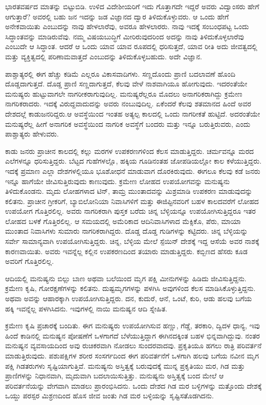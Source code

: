 ಭಾರತವರ್ಷದ ಮಾತನ್ನು ಬಿಟ್ಟುಬಿಡಿ. ಉಳಿದ ವಿದೇಶೀಯರಿಗೆ ಇದು ಗೊತ್ತಾಗದೇ ಇದ್ದರೆ ಅವರು ವಿದ್ವಾಂಸರು ಹೇಗೆ ಆಗುತ್ತಾರೆ? ಅವರಲ್ಲಿ ಬಹು ಜನ ಇದನ್ನು ಜಡ ವಿಜ್ಞಾನದ ದ್ವಾರ ತಿಳಿದುಕೊಳ್ಳುವರು. ಆ ಒಂದು ಹೇಗೆ ಅನೇಕವಾಯಿತು ಎಂಬುದನ್ನು ನಾವು ಹೇಳಲಾರೆವು, ಅವರೂ ಹೇಳಲಾರರು. ನಾವು ಇದಕ್ಕೆ ಸಂಬಂಧಪಟ್ಟ ಒಂದು ಸಿದ್ಧಾಂತವನ್ನು ಮಾಡಿರುವೆವು. ನಮ್ಮ ವಿಷಯಬುದ್ಧಿಗೆ ಮೀರಿರುವುದರಿಂದ ಅದನ್ನು ನಾವು ತಿಳಿದುಕೊಳ್ಳಲಾರೆವು ಎಂಬುದೇ ಆ ಸಿದ್ಧಾಂತ. ಆದರೆ ಆ ಒಂದು ಯಾವ ಯಾವ ರೂಪದಲ್ಲಿ ಧರಿಸುತ್ತದೆ, ಯಾವ ರೀತಿ ಅದು ಜೀವತ್ವದಲ್ಲಿ ಮತ್ತು ವ್ಯಕ್ತಿತ್ವದಲ್ಲಿ ಪರಿಣಾಮವಾತ್ತದೆ ಎಂಬುದನ್ನು ತಿಳಿದುಕೊಳ್ಳಬಹುದು. ಅದೇ ವಿಜ್ಞಾನ.

ಪಾಶ್ಚಾತ್ಯರಲ್ಲಿ ಈಗ ಹೆಚ್ಚು ಕಡಿಮೆ ಎಲ್ಲರೂ ವಿಕಾಸವಾದಿಗಳು. ಸಣ್ಣದೊಂದು ಪ್ರಾಣಿ ಬದಲಾವಣೆ ಹೊಂದಿ ದೊಡ್ಡದಾಗುತ್ತದೆ. ದೊಡ್ಡ ಪ್ರಾಣಿ ಸಣ್ಣದಾಗುತ್ತದೆ, ಕೆಲವು ವೇಳೆ ನಾಶವಾಗಿಯೂ ಹೋಗುವುದು. ಇದರಂತೆಯೇ ಮನುಷ್ಯರು ಹುಟ್ಟುವಾಗಲೇ ನಾಗರೀಕರಾಗುವುದಿಲ್ಲ. ಮನುಷ್ಯರೆಲ್ಲರೂ ಮೊದಲು ಅನಾಗರಿಕರಾಗಿದ್ದು ಕ್ರಮೇಣ ನಾಗರಿಕರಾದರು. ಇದಕ್ಕೆ ವಿರುದ್ದವಾದುದನ್ನು ಅವರು ನಂಬುವುದಿಲ್ಲ. ಏಕೆಂದರೆ ಕೆಲವು ಶತಮಾನದ ಹಿಂದೆ ಅವರ ದೇಶದಲ್ಲೆ ಕಾಡುಜನರಿದ್ದರು.ಆ ಅವಸ್ಥೆಯಿಂದ ಇಂತಹ ಅತ್ಯಲ್ಪ ಕಾಲದಲ್ಲಿ ಒಂದು ನಾಗರೀಕತೆ ಹುಟ್ಟಿದೆ. ಅದರಂತೆಯೇ ಮನುಷ್ಯರೆಲ್ಲ ಹೀಗೆ ಅನಾಗರಿಕ ಅವಸ್ಥೆಯಿಂದ ನಾಗರಿಕ ಅವಸ್ಥೆಗೆ ಬಂದರು ಮತ್ತು ಇನ್ನೂ ಬರುತ್ತಿರುವರು, ಎಂದು ಪಾಶ್ಚಾತ್ಯರು ಹೇಳುವರು.

ಕಾಡು ಜನರು ಪ್ರಾಚೀನ ಕಾಲದಲ್ಲಿ ಕಲ್ಲು ಮರಗಳ ಉಪಕರಣಗಳಿಂದ ಕೆಲಸ ಮಾಡುತ್ತಿದ್ದರು. ಚರ್ಮವನ್ನೂ ಮರದ ಎಲೆಗಳನ್ನೂ ಧರಿಸುತ್ತಿದ್ದರು. ಬೆಟ್ಟದ ಗುಹೆಗಳಲ್ಲೊ, ಹಕ್ಕಿಯ ಗೂಡಿನಂತಹ ಜೋಪಡಿಯಲ್ಲೋ ಕಾಲ ಕಳೆಯುತ್ತಿದ್ದರು. ಇದಕ್ಕೆ ಪ್ರಮಾಣ ಎಲ್ಲಾ ದೇಶಗಳಲ್ಲಿಯೂ ಭೂಶೋಧನೆ ಮಾಡುವಾಗ ದೊರಕಿರುವುದು. ಈಗಲೂ ಕೆಲವು ಕಡೆ ಜನರು ಇನ್ನೂ ಹಾಗೆಯೇ ಜೀವಿಸುತ್ತಿರುವುದು ಕಾಣುವುದು. ಕ್ರಮೇಣ ಲೋಹದ ಉಪಯೋಗವನ್ನು ಮನುಷ್ಯನು ತಿಳಿದುಕೊಂಡನು. ಮೃದು ಲೋಹಗಳಾದ ಟಿನ್​, ತಾಮ್ರ ಮುಂತಾದವನ್ನು ಮಿಶ್ರಮಾಡಿ ಉಪಕರಣ ಮಾಡುವುದನ್ನು ಕಲಿತನು. ಪ್ರಾಚೀನ ಗ್ರೀಕರಿಗೆ, ಬ್ಯಾಬಿಲೋನಿಯಾ ನಿವಾಸಿಗಳಿಗೆ ಮತ್ತು ಈಜಿಪ್ಟಿನವರಿಗೆ ಬಹಳ ಕಾಲದವರೆಗೆ ಲೋಹದ ಉಪಯೋಗ ಗೊತ್ತಿರಲಿಲ್ಲ. ಅವರು ನಾಗರಿಕರಾಗಿ ಪುಸ್ತಕ ಬರೆದು ಚಿನ್ನ ಬೆಳ್ಳಿಯನ್ನೂ ಉಪಯೋಗಿಸುತ್ತಿದ್ದರೂ ಇತರ ಲೋಹದ ಬಳಕೆ ಗೊತ್ತಿರಲಿಲ್ಲ. ಆ ಸಮಯದಲ್ಲಿ ಅಮೆರಿಕಾದ ಆದಿನಿವಾಸಿಗಳಾದ ಮೆಕ್ಸಿಕೊ, ಪೆರು, ಮಾಯಾ ಮುಂತಾದ ನಿವಾಸಿಗಳು ಸುಮಾರು ನಾಗರಿಕರಾಗಿದ್ದರು. ದೊಡ್ಡ ದೊಡ್ಡ ಗುಡಿಗಳನ್ನು ಕಟ್ಟಿದರು. ಚಿನ್ನ ಬೆಳ್ಳಿಯನ್ನು ಸರ್ವೇ ಸಾಮಾನ್ಯವಾಗಿ ಉಪಯೋಗಿಸುತ್ತಿದ್ದರು. ಚಿನ್ನ, ಬೆಳ್ಳಿಯ ಮೇಲೆ ಸ್ಪೆಯಿನ್​ ದೇಶಕ್ಕೆ ಇದ್ದ ಆಸೆಯೆ ಅವರ ನಾಶಕ್ಕೆ ಕಾರಣವಾಯಿತು. ಅವರು ಇವನ್ನೆಲ್ಲ ಕಲ್ಲಿನ ಉಪಕರಣದಿಂದ ತಯಾರು ಮಾಡುತ್ತಿದ್ದರು. ಕಬ್ಬಿಣದ ಹೆಸರು ಕೂಡ ಅವರಿಗೆ ಗೊತ್ತಿರಲಿಲ್ಲ.

ಆದಿಯಲ್ಲಿ ಮನುಷ್ಯನು ಬಿಲ್ಲು ಬಾಣ ಅಥವಾ ಬಲೆಯಿಂದ ಮೃಗ ಪಕ್ಷಿ ಮೀನುಗಳನ್ನು ಹಿಡಿದು ಜೀವಿಸುತ್ತಿದ್ದನು. ಕ್ರಮೇಣ ಕೃಷಿ, ಗೋರಕ್ಷಣೆಗಳನ್ನು ಕಲಿತನು. ದುಷ್ಟಮೃಗಗಳನ್ನು ಪಳಗಿಸಿ ಅವುಗಳಿಂದ ಕೆಲಸ ಮಾಡಿಸಿಕೊಳ್ಳುತ್ತಿದ್ದನು. ಅಥವಾ ಅವನ್ನು ಆಹಾರಕ್ಕಾಗಿ ಉಪಯೋಗಿಸುತ್ತಿದ್ದರು. ದನ, ಕುದುರೆ, ಆನೆ, ಒಂಟೆ, ಕುರಿ, ಆಡು ಹಲವು ಬಗೆಯ ಹಕ್ಕಿ ಇವನ್ನೆಲ್ಲ ಪಳಗಿಸಿದನು. ಇವುಗಳಲ್ಲಿ ನಾಯಿ ಮನುಷ್ಯನ ಆದಿ ಸ್ನೇಹಿತ.

ಕ್ರಮೇಣ ಕೃಷಿ ಪ್ರಚಾರಕ್ಕೆ ಬಂದಿತು. ಈಗ ಮನುಷ್ಯರು ಉಪಯೋಗಿಸುವ ಹಣ್ಣು, ಗೆಡ್ಡೆ, ತರಕಾರಿ, ದ್ವಿದಳ ಧಾನ್ಯ, ಇವು ಹಿಂದೆ ಕಾಡಿನಲ್ಲಿ ಮನುಷ್ಯನ ಪೋಷಣೆಗೆ ಒಳಗಾಗದೆ ಬೆಳೆಯುತ್ತಿದ್ದಾಗ ಈಗಿನದಕ್ಕಿಂತ ಬಹಳ ಭಿನ್ನವಾಗಿದ್ದುವು. ನಂತರ ಮನುಷ್ಯನ ವ್ಯವಸಾಯದಿಂದ ಅವು ರುಚಿಕರವಾಗಿ ನೋಡಲು ಸುಂದರವಾದವು. ಪ್ರಕೃತಿಯೂ ಹಗಲು ರಾತ್ರಿ ಪರಿವರ್ತನೆ ಮಾಡುತ್ತಿರುವುದು. ಪಶುಪಕ್ಷಿಗಳ ಶರೀರ ಸಂಸರ್ಗದಿಂದ ಈಗ ಪರಿವರ್ತನೆಗೆ ಒಳಗಾಗಿ ಹಲವು ಬಗೆಯ ನವೀನ ಮೃಗ ಪಕ್ಷಿ ಗಿಡತರುಗಳು ಸೃಷ್ಟಿಯಾಗುತ್ತಿವೆ. ಮನುಷ್ಯನು ಅಸ್ತಿತ್ವಕ್ಕೆ ಬರುವುದಕ್ಕೆ ಮುನ್ನ ಪ್ರಕೃತಿಯು ಮರ, ಗಿಡ ಮತ್ತು ಪ್ರಾಣಿಗಳನ್ನು ನಿಧಾನವಾಗಿ, ಮೃದುವಾಗಿ ಬದಲಾಯಿಸುತ್ತಿತ್ತು. ಮನುಷ್ಯನು ಅಸ್ತಿತ್ವಕ್ಕೆ ಬಂದ ಮೇಲೆ ಆ ಪರಿವರ್ತನೆಯನ್ನು ವೇಗವಾಗಿ ಮಾಡಲು ಪ್ರಾರಂಭಿಸಿದನು. ಒಂದು ದೇಶದ ಗಿಡ ಮರ ಬಳ್ಳಿಗಳನ್ನು ಮತ್ತೊಂದು ದೇಶಕ್ಕೆ ಒಯ್ದು ಪರಸ್ಪರ ಮಿಶ್ರಣದಿಂದ ಹೊಸ ಜೀವ ಜಂತು ಗಿಡ ಮರ ಬಳ್ಳಿಯನ್ನು ಸೃಷ್ಟಿಸತೊಡಗಿದನು.

